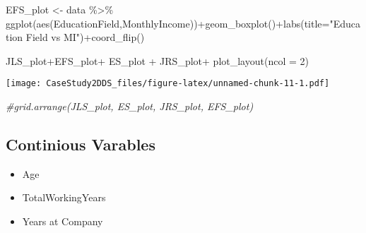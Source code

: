 \documentclass[
]{article}
\newenvironment{Shaded}{\begin{snugshade}}{\end{snugshade}}
\newcommand{\AttributeTok}[1]{\textcolor[rgb]{0.77,0.63,0.00}{#1}}
\newcommand{\CommentTok}[1]{\textcolor[rgb]{0.56,0.35,0.01}{\textit{#1}}}
\newcommand{\DecValTok}[1]{\textcolor[rgb]{0.00,0.00,0.81}{#1}}
\newcommand{\FunctionTok}[1]{\textcolor[rgb]{0.00,0.00,0.00}{#1}}
\newcommand{\NormalTok}[1]{#1}
\newcommand{\OtherTok}[1]{\textcolor[rgb]{0.56,0.35,0.01}{#1}}
\newcommand{\SpecialCharTok}[1]{\textcolor[rgb]{0.00,0.00,0.00}{#1}}
\newcommand{\StringTok}[1]{\textcolor[rgb]{0.31,0.60,0.02}{#1}}
\providecommand{\tightlist}{%
  \setlength{\itemsep}{0pt}\setlength{\parskip}{0pt}}
\begin{document}
\begin{Shaded}
\begin{Highlighting}[]
\NormalTok{EFS\_plot }\OtherTok{\textless{}{-}}\NormalTok{ data }\SpecialCharTok{\%\textgreater{}\%} \FunctionTok{ggplot}\NormalTok{(}\FunctionTok{aes}\NormalTok{(EducationField,MonthlyIncome))}\SpecialCharTok{+}\FunctionTok{geom\_boxplot}\NormalTok{()}\SpecialCharTok{+}\FunctionTok{labs}\NormalTok{(}\AttributeTok{title=}\StringTok{"Education Field vs MI"}\NormalTok{)}\SpecialCharTok{+}\FunctionTok{coord\_flip}\NormalTok{()}

\NormalTok{JLS\_plot}\SpecialCharTok{+}\NormalTok{EFS\_plot}\SpecialCharTok{+}\NormalTok{ ES\_plot }\SpecialCharTok{+}\NormalTok{ JRS\_plot}\SpecialCharTok{+}  \FunctionTok{plot\_layout}\NormalTok{(}\AttributeTok{ncol =} \DecValTok{2}\NormalTok{)}
\end{Highlighting}
\end{Shaded}

\texttt{[image: CaseStudy2DDS\_files/figure-latex/unnamed-chunk-11-1.pdf]}

\begin{Shaded}
\begin{Highlighting}[]
\CommentTok{\#grid.arrange(JLS\_plot, ES\_plot, JRS\_plot, EFS\_plot)}
\end{Highlighting}
\end{Shaded}

\hypertarget{continious-varables}{%
\subsection{Continious Varables}\label{continious-varables}}

\begin{itemize}
\tightlist
\item
  Age\\
\item
  TotalWorkingYears\\
\item
  Years at Company
\end{itemize}
\end{document}
